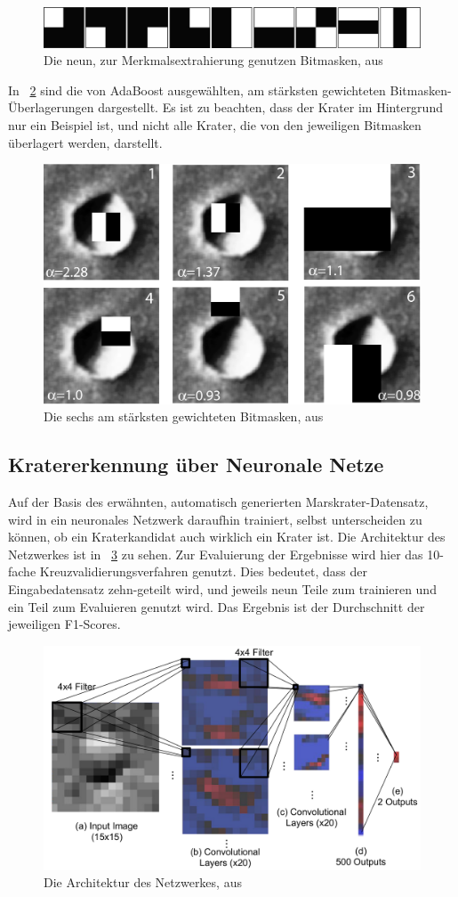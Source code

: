 \begin{figure}[h!]
	\centering
	\includegraphics[width=.8\textwidth,keepaspectratio]{images/BDS12_01.png}
	\caption{Die neun, zur Merkmalsextrahierung genutzen Bitmasken, aus \cite{bandeira_12}}
	\label{fig:BDS12_01}
\end{figure}

In \figurename~\ref{fig:BDS12_02} sind die von AdaBoost ausgewählten, am stärksten gewichteten Bitmasken-Überlagerungen dargestellt. Es ist zu beachten, dass der Krater im Hintergrund nur ein Beispiel ist, und nicht alle Krater, die von den jeweiligen Bitmasken überlagert werden, darstellt.

\begin{figure}[h!]
	\centering
	\includegraphics[width=.5\textwidth,keepaspectratio]{images/BDS12_02.png}
	\caption{Die sechs am stärksten gewichteten Bitmasken, aus \cite{bandeira_12}}
	\label{fig:BDS12_02}
\end{figure}

\subsection{Kratererkennung über Neuronale Netze}
\label{ssec:crater_cnn}
Auf der Basis des erwähnten, automatisch generierten Marskrater-Datensatz, wird in \cite{cohen_16} ein neuronales Netzwerk daraufhin trainiert, selbst unterscheiden zu können, ob ein Kraterkandidat auch wirklich ein Krater ist. Die Architektur des Netzwerkes ist in \figurename~\ref{fig:CLLD16_01} zu sehen. Zur Evaluierung der Ergebnisse wird hier das 10-fache Kreuzvalidierungsverfahren genutzt. Dies bedeutet, dass der Eingabedatensatz zehn-geteilt wird, und jeweils neun Teile zum trainieren und ein Teil zum Evaluieren genutzt wird. Das Ergebnis ist der Durchschnitt der jeweiligen F1-Scores.

\begin{figure}[H]
	\centering
	\includegraphics[width=.5\textwidth,keepaspectratio]{images/CLLD16_01.png}
	\caption{Die Architektur des Netzwerkes, aus \cite{cohen_16}}
	\label{fig:CLLD16_01}
\end{figure}

